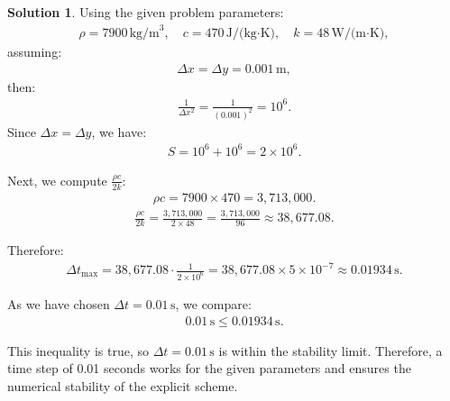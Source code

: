 \documentclass[12pt]{article}
\theoremstyle{definition} %
\newtheorem{solution}{Solution}
\theoremstyle{plain} %
\begin{document}
\begin{solution}
            \noindent Using the given problem parameters:
            \begin{align}
            \rho = 7900\,\text{kg/m}^3, \quad c = 470\,\text{J/(kg·K)}, \quad k = 48\,\text{W/(m·K)},
            \end{align}
            assuming:
            \begin{align}
            \Delta x = \Delta y = 0.001\,\text{m},
            \end{align}
            then:
            \begin{align}
            \frac{1}{\Delta x^2} = \frac{1}{(0.001)^2} = 10^6.
            \end{align}
            Since $\Delta x = \Delta y$, we have:
            \begin{align}
            S = 10^6 + 10^6 = 2 \times 10^6.
            \end{align}
            
            \noindent Next, we compute $\frac{\rho c}{2k}$:
            \begin{align}
            \rho c = 7900 \times 470 = 3{,}713{,}000.
            \end{align}
            \begin{align}
            \frac{\rho c}{2k} = \frac{3{,}713{,}000}{2 \times 48} = \frac{3{,}713{,}000}{96} \approx 38{,}677.08.
            \end{align}
            
            \noindent Therefore:
            \begin{align}
            \Delta t_{\max} = 38{,}677.08 \cdot \frac{1}{2 \times 10^6} = 38{,}677.08 \times 5 \times 10^{-7} \approx 0.01934\,\text{s}.
            \end{align}
            
            \noindent As we have chosen $\Delta t = 0.01\,\text{s}$, we compare:
            \begin{align}
            0.01\,\text{s} \leq 0.01934\,\text{s}.
            \end{align}
            
            \noindent This inequality is true, so $\Delta t = 0.01\,\text{s}$ is within the stability limit. Therefore, a time step of 0.01 seconds works for the given parameters and ensures the numerical stability of the explicit scheme.
        
        
        \begin{enumerate}
            


\end{enumerate}
\end{solution}
\end{document}
